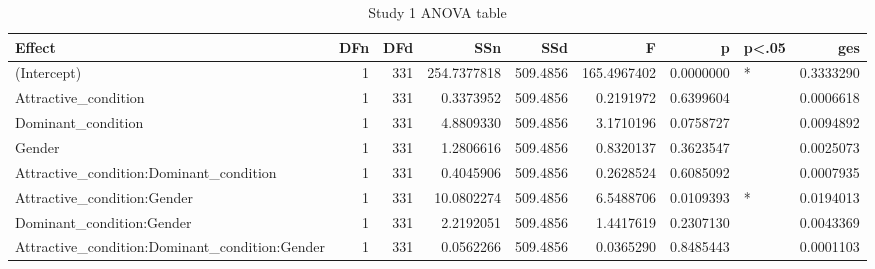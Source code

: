 \begin{table}

\caption{Study 1 ANOVA table}
\centering
\begin{tabular}[t]{lrrrrrrlr}
\toprule
Effect & DFn & DFd & SSn & SSd & F & p & p<.05 & ges\\
\midrule
(Intercept) & 1 & 331 & 254.7377818 & 509.4856 & 165.4967402 & 0.0000000 & * & 0.3333290\\
Attractive\_condition & 1 & 331 & 0.3373952 & 509.4856 & 0.2191972 & 0.6399604 &  & 0.0006618\\
Dominant\_condition & 1 & 331 & 4.8809330 & 509.4856 & 3.1710196 & 0.0758727 &  & 0.0094892\\
Gender & 1 & 331 & 1.2806616 & 509.4856 & 0.8320137 & 0.3623547 &  & 0.0025073\\
Attractive\_condition:Dominant\_condition & 1 & 331 & 0.4045906 & 509.4856 & 0.2628524 & 0.6085092 &  & 0.0007935\\
\addlinespace
Attractive\_condition:Gender & 1 & 331 & 10.0802274 & 509.4856 & 6.5488706 & 0.0109393 & * & 0.0194013\\
Dominant\_condition:Gender & 1 & 331 & 2.2192051 & 509.4856 & 1.4417619 & 0.2307130 &  & 0.0043369\\
Attractive\_condition:Dominant\_condition:Gender & 1 & 331 & 0.0562266 & 509.4856 & 0.0365290 & 0.8485443 &  & 0.0001103\\
\bottomrule
\end{tabular}
\end{table}

